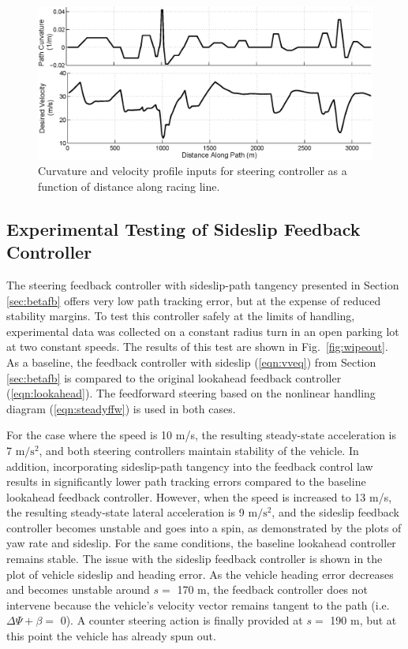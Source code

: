 \documentclass{nVSD2e}
\theoremstyle{plain}
\theoremstyle{definition}
\theoremstyle{remark}
\begin{document}
\begin{figure}[h]
\centering
\includegraphics[width=.8\columnwidth]{figures/traj.eps}
\caption{Curvature and velocity profile inputs for steering controller as a function of distance along racing line.}
\label{fig:traj}
\end{figure}

\subsection{Experimental Testing of Sideslip Feedback Controller}

The steering feedback controller with sideslip-path tangency presented in Section \ref{sec:betafb} offers very low path tracking error, but at the
expense of reduced stability margins. To test this controller safely at the limits of handling, experimental data was collected on a
constant radius turn in an open parking lot at two constant speeds. The results of this test are shown in Fig.~\ref{fig:wipeout}. As a baseline, the
feedback controller with sideslip (\ref{eqn:vveq}) from Section \ref{sec:betafb} is compared to the original lookahead feedback controller (\ref{eqn:lookahead}). 
The feedforward steering based on the nonlinear handling diagram (\ref{eqn:steadyffw}) is used in both cases. 

For the case where the speed is 10 m/s, the resulting steady-state acceleration is 7 $\mathrm{m/s^2}$, and both steering controllers maintain stability of the vehicle. 
In addition, incorporating sideslip-path tangency into the feedback control law results in significantly lower path tracking errors compared to the baseline
lookahead feedback controller. However, when the speed is increased to 13 m/s, the resulting steady-state lateral acceleration is 9 $\mathrm{m/s^2}$,
and the sideslip feedback controller becomes unstable and goes into a spin, as demonstrated by the plots of yaw rate and sideslip. For the same conditions,
the baseline lookahead controller remains stable. The issue with the sideslip feedback controller is shown in the plot of vehicle sideslip and heading
error. As the vehicle heading error decreases and becomes unstable around $s = $ 170 m, the feedback controller does not intervene because the
 vehicle's velocity vector remains tangent to the path (i.e. $\Delta\Psi + \beta =$ 0). A counter steering action is finally provided at $s = $ 190 m, but at this point the vehicle
has already spun out.
\end{document}
